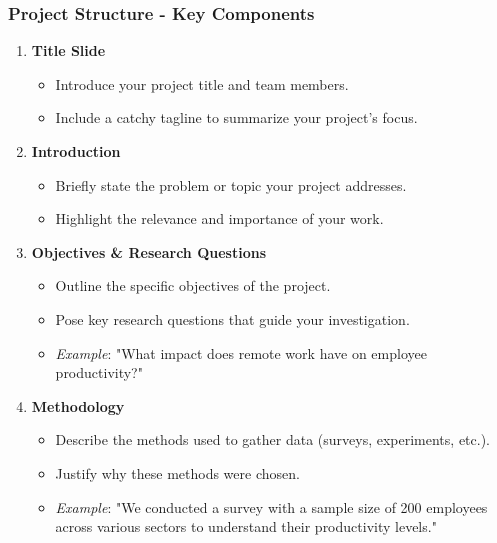 \documentclass{beamer}
\begin{document}
\begin{frame}[fragile]
    \frametitle{Project Structure - Key Components}
    \begin{enumerate}
        \item \textbf{Title Slide}
            \begin{itemize}
                \item Introduce your project title and team members.
                \item Include a catchy tagline to summarize your project’s focus.
            \end{itemize}

        \item \textbf{Introduction}
            \begin{itemize}
                \item Briefly state the problem or topic your project addresses.
                \item Highlight the relevance and importance of your work.
            \end{itemize}

        \item \textbf{Objectives \& Research Questions}
            \begin{itemize}
                \item Outline the specific objectives of the project.
                \item Pose key research questions that guide your investigation.
                \item \textit{Example}: "What impact does remote work have on employee productivity?"
            \end{itemize}

        \item \textbf{Methodology}
            \begin{itemize}
                \item Describe the methods used to gather data (surveys, experiments, etc.).
                \item Justify why these methods were chosen.
                \item \textit{Example}: "We conducted a survey with a sample size of 200 employees across various sectors to understand their productivity levels."
            \end{itemize}
    \end{enumerate}
\end{frame}
\end{document}
